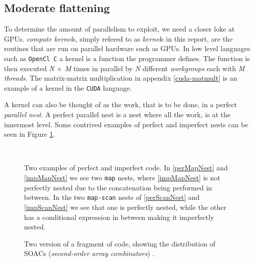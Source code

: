 \subsection{Moderate flattening}
To determine the amount of parallelism to exploit, we need a closer loke at
GPUs. \textit{compute kernel}s, simply refered to as \textit{kernel}s in this
report, are the routines that are run on parallel hardware such as GPUs.  In 
low level languages such as \texttt{OpenCl C} a kernel is a function the
programmer defines. The function is then executed \textit{N $\times$ M} times 
in parallel by
\textit{N} different \textit{workgroups} each with \textit{M}  
\textit{threads}.
The matrix-matrix multiplication in appendix \ref{cuda-matmult} is an example
of a kernel in the \texttt{CUDA} language.

A kernel can also be thought of as the work, that is to be done, in a perfect
\textit{parallel nest}. A perfect parallel nest is a nest where all the work,
is at the innermost level. Some contrived examples of perfect and imperfect
nests can be seen in Figure \ref{nests}.

\begin{figure}[h]
  \centering
  \hspace{2cm}
  \\
  \hspace{2cm}
  \caption{Two examples of perfect and imperfect code. In \ref{perMapNest} and 
  \ref{impMapNest} we see two \texttt{map} nests, where \ref{impMapNest} is not 
perfectly nested due to the concatenation being performed in between. In the 
two \texttt{map-scan} nests of \ref{perScanNest} and \ref{impScanNest} we see 
that one is perfectly nested, while the other has a conditional expression in 
between making it imperfectly nested.}
  \label{nests}
\end{figure}
\begin{figure}[H]
\centering
  \hspace{2cm}
  \caption{Two version of a fragment of code, showing the distribution of SOACs 
  (\textit{second-order array combinators}) \cite{futhark-moderate-blog}.}
  \label{loopDist}
\end{figure}

